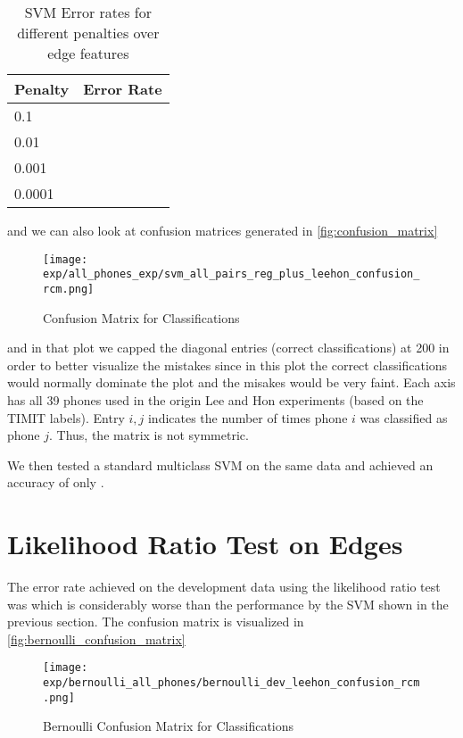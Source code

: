 \documentclass{article}
\begin{document}
\begin{table}[h]
  \centering
  \begin{tabular}{| l |  r |}
    \hline
     Penalty & Error Rate \\ \hline\hline
     0.1 &  \\
     \hline
     0.01 &  \\
     \hline
     0.001 &  \\
     \hline
     0.0001 &   \\
     \hline
  \end{tabular}
  \caption{SVM Error rates for different penalties over edge features}
  \label{tab:myfirsttable}
\end{table}
and we can also look at confusion matrices generated in \autoref{fig:confusion_matrix}
\begin{figure}[h]
\centering
\texttt{[image: exp/all\_phones\_exp/svm\_all\_pairs\_reg\_plus\_leehon\_confusion\_rcm.png]}
\caption{Confusion Matrix for Classifications}
\label{fig:confusion_matrix}
\end{figure}
and in that plot we capped the diagonal entries (correct classifications) at 200
in order to better visualize the mistakes since in this plot the
correct classifications would normally dominate the plot and the misakes would be very faint.  Each axis has all 39 phones used in the origin Lee and Hon experiments (based on the TIMIT labels).  Entry $i,j$ indicates the number of times phone $i$ was classified as phone $j$.  Thus, the matrix is not symmetric.

We then tested a standard multiclass SVM on the same data and
achieved an accuracy of only .

\section{Likelihood Ratio Test on Edges}

The error rate achieved on the development data using the likelihood
ratio test was  which is considerably worse than the performance by
the SVM shown in the previous section.  The confusion matrix is
visualized in \autoref{fig:bernoulli_confusion_matrix}
\begin{figure}[h]
\centering
\texttt{[image: exp/bernoulli\_all\_phones/bernoulli\_dev\_leehon\_confusion\_rcm.png]}
\caption{Bernoulli Confusion Matrix for Classifications}
\label{fig:bernoulli_confusion_matrix}
\end{figure}
\end{document}
